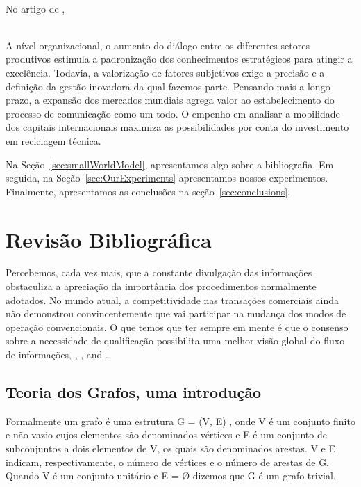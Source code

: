 \documentclass{endm}
\begin{document}
    \\

    No artigo de \cite{nair01:MSc},

    \\

    A nível organizacional, o aumento do diálogo entre os diferentes setores produtivos estimula a padronização dos conhecimentos estratégicos para atingir a excelência. Todavia, a valorização de fatores subjetivos exige a precisão e a definição da gestão inovadora da qual fazemos parte. Pensando mais a longo prazo, a expansão dos mercados mundiais agrega valor ao estabelecimento do processo de comunicação como um todo. O empenho em analisar a mobilidade dos capitais internacionais maximiza as possibilidades por conta do investimento em reciclagem técnica.

Na Seção~\ref{sec:smallWorldModel}, apresentamos algo sobre a bibliografia. Em seguida, na Seção~\ref{sec:OurExperiments} apresentamos nossos experimentos. Finalmente, apresentamos as conclusões na seção~\ref{sec:conclusions}.


\section{Revisão Bibliográfica} \label{sec:basicConcepts}

 Percebemos, cada vez mais, que a constante divulgação das informações obstaculiza a apreciação da importância dos procedimentos normalmente adotados. No mundo atual, a competitividade nas transações comerciais ainda não demonstrou convincentemente que vai participar na mudança dos modos de operação convencionais. O que temos que ter sempre em mente é que o consenso sobre a necessidade de qualificação possibilita uma melhor visão global do fluxo de informações, \cite{Diestel}, \cite{fan2006}, \cite{newman2010} and  \cite{Molitierno}.


\subsection{Teoria dos Grafos, uma introdução}

Formalmente um grafo é uma estrutura G = (V, E) , onde V é um conjunto finito e não vazio cujos elementos são denominados vértices e E é um conjunto de subconjuntos a dois elementos de V, os quais são denominados arestas. V e E indicam, respectivamente, o número de vértices e o número de arestas de G. Quando V é um conjunto unitário e E = Ø dizemos que G é um grafo trivial. %
\end{document}
